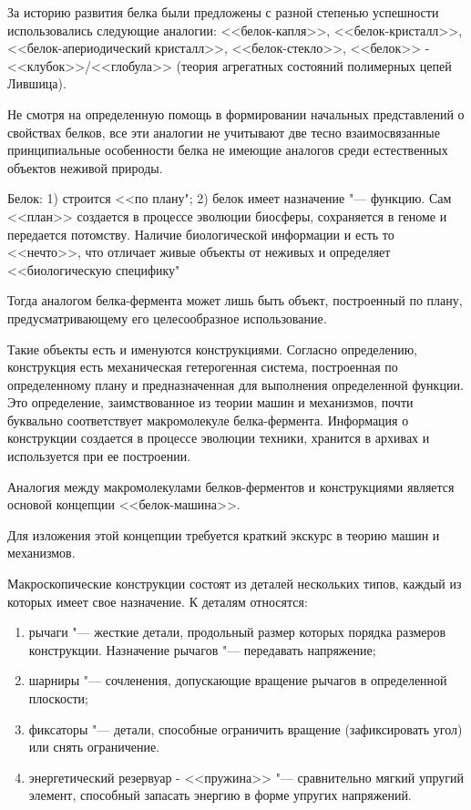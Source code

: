 \documentclass[12pt,a4paper,oneside]{book}
\begin{document}
За историю развития белка были предложены с разной степенью успешности использовались следующие аналогии: <<белок-капля>>, <<белок-кристалл>>, <<белок-апериодический кристалл>>, <<белок-стекло>>, <<белок>> - <<клубок>>/<<глобула>> (теория агрегатных состояний полимерных цепей Лившица). 

Не смотря на определенную помощь в формировании начальных представлений о свойствах белков, все эти аналогии не учитывают две тесно взаимосвязанные принципиальные особенности белка не имеющие аналогов среди естественных объектов неживой природы. 

Белок: 1) строится <<по плану"; 2) белок имеет назначение "--- функцию. Сам <<план>> создается в процессе эволюции биосферы, сохраняется в геноме и передается потомству. 
Наличие биологической информации и есть то <<нечто>>, что отличает живые объекты от неживых и определяет <<биологическую специфику"

Тогда аналогом белка-фермента может лишь быть объект, построенный по плану, предусматривающему его целесообразное использование. 

Такие объекты есть и именуются конструкциями. Согласно определению, конструкция есть механическая гетерогенная система, построенная по определенному плану и предназначенная для выполнения определенной функции. Это определение, заимствованное из теории машин и механизмов, почти буквально соответствует макромолекуле белка-фермента. Информация о конструкции создается в процессе эволюции техники, хранится в архивах и используется при ее построении.
 
Аналогия между макромолекулами белков-ферментов и конструкциями является основой концепции <<белок-машина>>. 

Для изложения этой концепции требуется краткий экскурс в теорию машин и механизмов.

Макроскопические конструкции состоят из деталей нескольких типов, каждый из которых имеет свое назначение. К деталям относятся:
\begin{enumerate}
\item рычаги "--- жесткие детали, продольный размер которых порядка размеров конструкции. Назначение рычагов "--- передавать напряжение;
\item шарниры "--- сочленения, допускающие вращение рычагов в определенной плоскости;
\item фиксаторы "--- детали, способные ограничить вращение (зафиксировать угол) или снять ограничение.
\item энергетический резервуар - <<пружина>> "--- сравнительно мягкий упругий элемент, способный запасать энергию в форме упругих напряжений. 
\end{enumerate}
\end{document}
